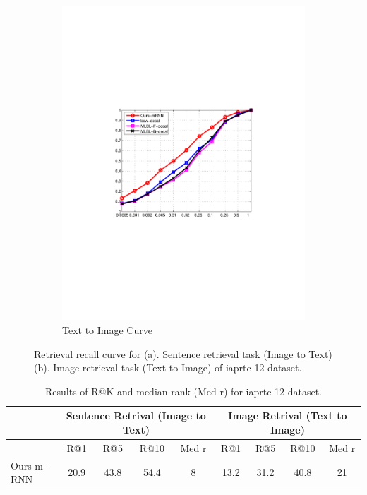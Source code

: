 \begin{figure}[htb]
\begin{subfigure}[b]{0.42\textwidth}
                \includegraphics[width=\textwidth]{PaperFigures/T2I_iaprtc.pdf}
                \caption{Text to Image Curve}
        \end{subfigure}
        \caption{Retrieval recall curve for (a). Sentence retrieval task (Image to Text) (b). Image retrieval task (Text to Image) of iaprtc-12 dataset.}
        \label{fig:iaprtc_ret_curve}
\end{figure}

\begin{table}[htb]
	\centering
\begin{tabular}{l|cccc|cccc}
\hline
      & \multicolumn{4}{c|}{Sentence Retrival (Image to Text)} & \multicolumn{4}{c}{Image Retrival (Text to Image)} \\
\hline
      & R@1   & R@5   & R@10  & Med r & R@1   & R@5   & R@10  & Med r \\
\hline
Ours-m-RNN & 20.9  & 43.8  & 54.4  & 8     & 13.2  & 31.2  & 40.8  & 21 \\
\hline
\end{tabular}%
	\caption{Results of R@K and median rank (Med r) for iaprtc-12 dataset.}
	\label{tab:iaprtc_ret}
\end{table}

